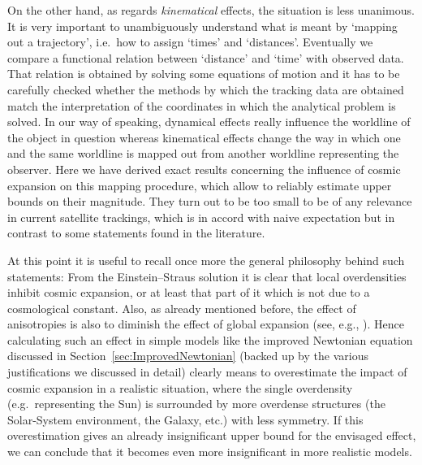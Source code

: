 \documentclass
[rmp,aps,twocolumn,showpacs,preprintnumbers,amsmath,amssymb]{revtex4}
\theoremstyle{plain}
\theoremstyle{definition}
\theoremstyle{remark}
\begin{document}
On the other hand, as regards \emph{kinematical} effects, the situation 
is less unanimous. It is very important to unambiguously understand 
what is meant by `mapping out a trajectory', i.e.~how to assign `times' 
and `distances'. Eventually we compare a functional relation between 
`distance' and `time' with observed data. That relation is obtained by 
solving some equations of motion and it has to be carefully checked 
whether the methods by which the tracking data are obtained match the 
interpretation of the coordinates in which the analytical problem is 
solved. In our way of speaking, dynamical effects really influence the 
worldline of the object in question whereas kinematical effects 
change the way in which one and the same worldline is mapped out 
from another worldline representing the observer. Here we have derived 
exact results concerning the influence of cosmic expansion on this 
mapping procedure, which allow to reliably estimate upper bounds 
on their magnitude.  They turn out to be too small to be of any relevance 
in current  satellite trackings, which is in accord with naive 
expectation but in contrast to some statements found in the 
literature. 

At this point it is useful to recall once more the general philosophy 
behind such statements: From the Einstein--Straus solution it is clear that 
local overdensities inhibit cosmic expansion, or at least that part of 
it which is not due to a cosmological constant. Also, as already mentioned 
before, the effect of anisotropies is also to diminish the effect 
of global expansion (see, e.g., \cite{Dominguez.Gaite:2001}). 
Hence calculating such an effect in simple models like the improved 
Newtonian equation discussed in Section~\ref{sec:ImprovedNewtonian} 
(backed up by the various justifications we discussed in detail) 
clearly means to overestimate the impact of cosmic expansion in a 
realistic situation, where the single overdensity (e.g.~representing 
the Sun) is surrounded by more overdense structures (the Solar-System 
environment, the Galaxy, etc.) with less symmetry. If this 
overestimation gives an already insignificant upper bound for the 
envisaged effect, we can conclude that it becomes even more 
insignificant in more realistic models.
\end{document}
